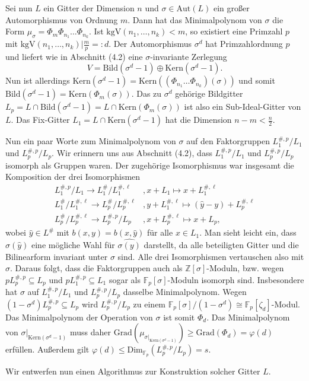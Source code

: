 \documentclass[12pt,a4paper,halfparskip,headsepline,bibtotocnumbered]{scrreprt}
\theoremstyle{nummermitklammern}
\theoremstyle{nonumberbreak}
\newcommand{\Z}{\mathbb{Z}}
\newcommand{\F}{\mathbb{F}}
\newcommand{\Kern}{\text{Kern}}
\newcommand{\Bild}{\text{Bild}}
\newcommand{\kgV}{\text{kgV}}
\newcommand{\Aut}{\text{Aut}}
\begin{document}
Sei nun $L$ ein Gitter der Dimension $n$ und $\sigma \in \Aut(L)$ ein großer Automorphismus von Ordnung $m$. Dann hat das Minimalpolynom von $\sigma$ die Form $\mu_\sigma = \Phi_m \Phi_{n_1} \dots \Phi_{n_k}$. Ist $\kgV(n_1, \dots, n_k) < m$, so existiert eine Primzahl $p$ mit $\kgV(n_1, \dots, n_k) \vert \frac{m}{p} =: d$. Der Automorphismus $\sigma^d$ hat Primzahlordnung $p$ und liefert wie in Abschnitt (4.2) eine $\sigma$-invariante Zerlegung 
\begin{equation*}
	V = \Bild(\sigma^d-1) \oplus \Kern(\sigma^d-1).
\end{equation*}
Nun ist allerdings $\Kern(\sigma^d-1) = \Kern\left((\Phi_{n_1} \dots \Phi_{n_k})(\sigma)\right)$ und somit $\Bild(\sigma^d-1) = \Kern(\Phi_m(\sigma))$. Das zu $\sigma^d$ gehörige Bildgitter $L_p = L \cap \Bild(\sigma^d-1) = L \cap \Kern(\Phi_m(\sigma))$ ist also ein Sub-Ideal-Gitter von $L$. Das Fix-Gitter $L_1 = L \cap \Kern(\sigma^d-1)$ hat die Dimension $n-m < \frac{n}{2}$.\par
Nun ein paar Worte zum Minimalpolynom von $\sigma$ auf den Faktorgruppen $L_1^{\#,p}/L_1$ und $L_p^{\#,p} / L_p$. Wir erinnern uns aus Abschnitt (4.2), dass $L_1^{\#,p}/L_1$ und $L_p^{\#,p} / L_p$ isomorph als Gruppen waren. Der zugehörige Isomorphismus war insgesamt die Komposition der drei Isomorphismen
\begin{align*}
	L_1^{\#,p} / L_1 \rightarrow L_1^\# / L_1^{\#, \ell}&, x + L_1 \mapsto x + L_1^{\#, \ell}\\
	L_1^\#/L_1^{\#,\ell} \rightarrow L_p^\# / L_p^{\#,\ell}&, y + L_1^{\#, \ell} \mapsto (\hat{y} - y) + L_p^{\#, \ell}\\
	L_p^\# / L_p^{\#, \ell} \rightarrow L_p^{\#,p} / L_p&, x + L_p^{\#, \ell} \mapsto x + L_p,
\end{align*}
wobei $\hat{y} \in L^\#$ mit $b(x,y) = b(x,\hat{y})$ für alle $x \in L_1$. Man sieht leicht ein, dass $\sigma(\hat{y})$ eine mögliche Wahl für $\widehat{\sigma(y)}$ darstellt, da alle beteiligten Gitter und die Bilinearform invariant unter $\sigma$ sind. Alle drei Isomorphismen vertauschen also mit $\sigma$. Daraus folgt, dass die Faktorgruppen auch als $\Z[\sigma]$-Moduln, bzw. wegen $p L_p^{\#,p} \subseteq L_p$ und $p L_1^{\#,p} \subseteq L_1$ sogar als $\F_p[\sigma]$-Moduln isomorph sind. Insbesondere hat $\sigma$ auf $L_1^{\#,p}/L_1$ und $L_p^{\#,p}/L_p$ dasselbe Minimalpolynom. Wegen $(1-\sigma^d) L_p^{\#,p} \subseteq L_p$ wird $L_p^{\#,p}/L_p$ zu einem $\F_p[\sigma] / (1-\sigma^d) \cong \F_p[\zeta_d]$-Modul. Das Minimalpolynom der Operation von $\sigma$ ist somit $\Phi_d$. Das Minimalpolynom von $\sigma \vert_{\Kern(\sigma^d-1)}$ muss daher $\text{Grad}(\mu_{\sigma \vert_{\Kern(\sigma^d-1)}}) \geq \text{Grad}(\Phi_d) = \varphi(d)$ erfüllen. Außerdem gilt $\varphi(d) \leq \text{Dim}_{\F_p}(L_p^{\#,p} / L_p) = s$.\par
Wir entwerfen nun einen Algorithmus zur Konstruktion solcher Gitter $L$.
\end{document}
